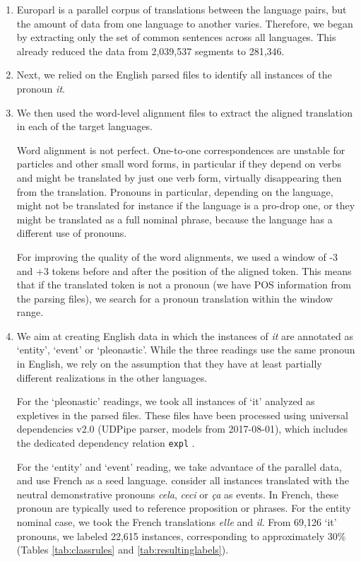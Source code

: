 \documentclass[10pt, a4paper]{article} \usepackage{lrec} \usepackage{multibib}
\begin{document}
\begin{enumerate}\setlength\itemsep{1em}

\item Europarl is a parallel corpus of translations
between the language pairs, but the amount of data from one language to another
varies. Therefore, we began by extracting only the set of common sentences
across all languages. This already reduced the data from 2,039,537 segments to
281,346. 

\item  Next, we relied on the English parsed files to
identify all instances of the pronoun \textit{it}.

\item We then used the word-level alignment files to
extract the aligned translation in each of the target languages.

Word alignment is not perfect. One-to-one correspondences are unstable for
particles and other small word forms, in particular if they depend on verbs and 
might be translated by just one verb form, virtually disappearing then from the
translation. Pronouns in particular, depending on the language, might not be
translated for instance if the language is a pro-drop one, or they might be
translated as a full nominal phrase, because the language has a different use of
pronouns.

For improving the quality of the word alignments, we used a window of -3 and
+3 tokens before and after the position of the aligned token. This means that if
the translated token is not a pronoun (we have POS information from the parsing
files), we search for a pronoun translation within the window range.

\item We aim at creating English data in which the instances of
\textit{it} are annotated as `entity', `event' or `pleonastic'. While the three
readings use the same pronoun in English, we rely on the assumption that they
have at least partially different realizations in the other languages.

For the `pleonastic' readings, we took all instances of `it' analyzed as 
expletives in the parsed files. These files have been processed using universal 
dependencies v2.0 (UDPipe parser, models from 2017-08-01), which includes the 
dedicated dependency relation \texttt{expl} \cite{bouma-etal-2018-expletives}.

For the `entity' and `event' reading, we take advantace of the parallel data, 
and use French as a seed language. 
consider all instances translated with the neutral demonstrative pronouns
\textit{cela}, \textit{ceci} or \textit{ça} as events. In French, these pronoun
are typically used to reference proposition or phrases. For the entity nominal
case, we took the French translations \textit{elle} and \textit{il}. From 69,126
`it' pronouns, we labeled 22,615 instances, corresponding to approximately 30\%
(Tables \ref{tab:classrules} and \ref{tab:resultinglabels}).


\end{enumerate}
\end{document}
